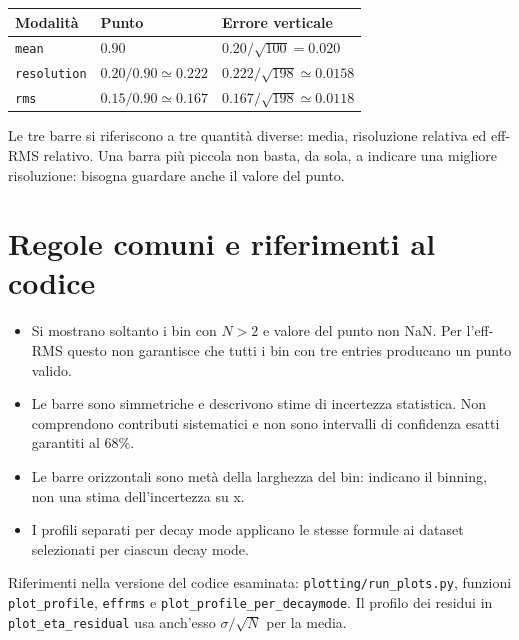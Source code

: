 \documentclass[11pt,a4paper]{article}
\begin{document}
\begin{center}
\begin{tabular}{lll}
\toprule
Modalità & Punto & Errore verticale\\
\midrule
\texttt{mean} & $0.90$ & $0.20/\sqrt{100}=0.020$\\
\texttt{resolution} & $0.20/0.90\simeq0.222$ & $0.222/\sqrt{198}\simeq0.0158$\\
\texttt{rms} & $0.15/0.90\simeq0.167$ & $0.167/\sqrt{198}\simeq0.0118$\\
\bottomrule
\end{tabular}
\end{center}
Le tre barre si riferiscono a tre quantità diverse: media, risoluzione relativa ed eff-RMS relativo. Una barra più piccola non basta, da sola, a indicare una migliore risoluzione: bisogna guardare anche il valore del punto.

\section{Regole comuni e riferimenti al codice}
\begin{itemize}
\item Si mostrano soltanto i bin con $N>2$ e valore del punto non NaN. Per l'eff-RMS questo non garantisce che tutti i bin con tre entries producano un punto valido.
\item Le barre sono simmetriche e descrivono stime di incertezza statistica. Non comprendono contributi sistematici e non sono intervalli di confidenza esatti garantiti al 68\%.
\item Le barre orizzontali sono metà della larghezza del bin: indicano il binning, non una stima dell'incertezza su x.
\item I profili separati per decay mode applicano le stesse formule ai dataset selezionati per ciascun decay mode.
\end{itemize}

Riferimenti nella versione del codice esaminata: \texttt{plotting/run\_plots.py}, funzioni \texttt{plot\_profile}, \texttt{effrms} e \texttt{plot\_profile\_per\_decaymode}. Il profilo dei residui in \texttt{plot\_eta\_residual} usa anch'esso $\sigma/\sqrt{N}$ per la media.
\end{document}

